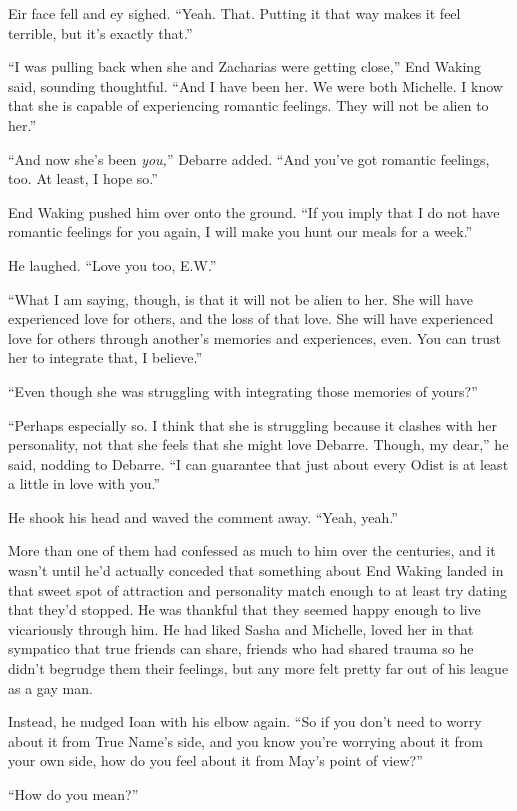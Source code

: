 Eir face fell and ey sighed. ``Yeah. That. Putting it that way makes it feel terrible, but it's exactly that.''

``I was pulling back when she and Zacharias were getting close,'' End Waking said, sounding thoughtful. ``And I have been her. We were both Michelle. I know that she is capable of experiencing romantic feelings. They will not be alien to her.''

``And now she's been \emph{you,}'' Debarre added. ``And you've got romantic feelings, too. At least, I hope so.''

End Waking pushed him over onto the ground. ``If you imply that I do not have romantic feelings for you again, I will make you hunt our meals for a week.''

He laughed. ``Love you too, E.W.''

``What I am saying, though, is that it will not be alien to her. She will have experienced love for others, and the loss of that love. She will have experienced love for others through another's memories and experiences, even. You can trust her to integrate that, I believe.''

``Even though she was struggling with integrating those memories of yours?''

``Perhaps especially so. I think that she is struggling because it clashes with her personality, not that she feels that she might love Debarre. Though, my dear,'' he said, nodding to Debarre. ``I can guarantee that just about every Odist is at least a little in love with you.''

He shook his head and waved the comment away. ``Yeah, yeah.''

More than one of them had confessed as much to him over the centuries, and it wasn't until he'd actually conceded that something about End Waking landed in that sweet spot of attraction and personality match enough to at least try dating that they'd stopped. He was thankful that they seemed happy enough to live vicariously through him. He had liked Sasha and Michelle, loved her in that sympatico that true friends can share, friends who had shared trauma so he didn't begrudge them their feelings, but any more felt pretty far out of his league as a gay man.

Instead, he nudged Ioan with his elbow again. ``So if you don't need to worry about it from True Name's side, and you know you're worrying about it from your own side, how do you feel about it from May's point of view?''

``How do you mean?''

